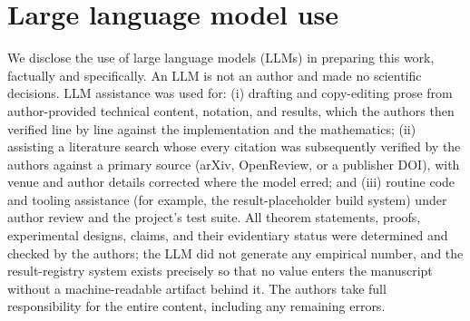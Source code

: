 \section{Large language model use}
\label{app:llm}

We disclose the use of large language models (LLMs) in preparing this work, factually and specifically. An
LLM is not an author and made no scientific decisions. LLM assistance was used for: (i) drafting and
copy-editing prose from author-provided technical content, notation, and results, which the authors then
verified line by line against the implementation and the mathematics; (ii) assisting a literature search
whose every citation was subsequently verified by the authors against a primary source (arXiv, OpenReview,
or a publisher DOI), with venue and author details corrected where the model erred; and (iii) routine code
and tooling assistance (for example, the result-placeholder build system) under author review and the
project's test suite. All theorem statements, proofs, experimental designs, claims, and their evidentiary
status were determined and checked by the authors; the LLM did not generate any empirical number, and the
result-registry system exists precisely so that no value enters the manuscript without a machine-readable
artifact behind it. The authors take full responsibility for the entire content, including any remaining
errors.
